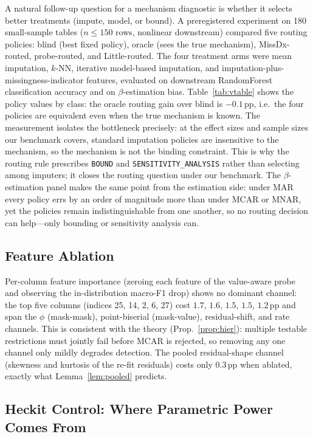\documentclass[conference]{IEEEtran}
\begin{document}
A natural follow-up question for a mechanism diagnostic is whether it selects better
treatments (impute, model, or bound). A preregistered experiment on 180 small-sample tables
($n\le150$ rows, nonlinear downstream) compared five routing policies: blind (best fixed
policy), oracle (sees the true mechanism), MissDx-routed, probe-routed, and Little-routed. The
four treatment arms were mean imputation, $k$-NN, iterative model-based imputation, and
imputation-plus-missingness-indicator features, evaluated on downstream RandomForest
classification accuracy and on $\beta$-estimation bias. Table~\ref{tab:vtable} shows
the policy values by class: the oracle routing gain over blind
is $-0.1$\,pp, i.e.\ the four policies are equivalent even when the true mechanism is known.
The measurement isolates the bottleneck precisely: at the effect sizes and sample sizes our
benchmark covers, standard imputation policies are insensitive to the mechanism, so the
mechanism is not the binding constraint. This is why the routing rule prescribes \texttt{BOUND} and
\texttt{SENSITIVITY\_ANALYSIS} rather than selecting among
imputers; it closes the routing question under our benchmark. The $\beta$-estimation panel
makes the same point from the estimation side: under MAR every policy errs by an order of
magnitude more than under MCAR or MNAR, yet the policies remain indistinguishable from one
another, so no routing decision can help---only bounding or sensitivity analysis can.

\subsection{Feature Ablation}\label{sec:ablation}

Per-column feature importance (zeroing each feature of the value-aware probe and observing the in-distribution macro-F1 drop) shows no dominant channel: the top five columns (indices 25, 14, 2, 6, 27) cost $1.7$, $1.6$, $1.5$, $1.5$, $1.2$\,pp and span the $\phi$ (mask-mask), point-biserial (mask-value), residual-shift, and rate channels. This is consistent with the theory (Prop.~\ref{prop:hier}): multiple testable restrictions must jointly fail before MCAR is rejected, so removing any one channel only mildly degrades detection. The pooled residual-shape channel (skewness and kurtosis of the re-fit residuals) costs only $0.3$\,pp when ablated, exactly what Lemma~\ref{lem:pooled} predicts.

\subsection{Heckit Control: Where Parametric Power Comes From}\label{sec:heckit-control}
\end{document}

